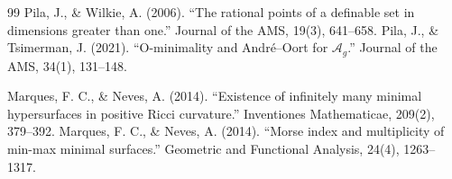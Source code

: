 \begin{thebibliography}{99}
 Pila, J., \& Wilkie, A. (2006). ``The rational points of a definable set in dimensions greater than one.'' Journal of the AMS, 19(3), 641--658.
 Pila, J., \& Tsimerman, J. (2021). ``O-minimality and André--Oort for $\mathcal{A}_g$.'' Journal of the AMS, 34(1), 131--148.

 Marques, F. C., \& Neves, A. (2014). ``Existence of infinitely many minimal hypersurfaces in positive Ricci curvature.'' Inventiones Mathematicae, 209(2), 379--392.
 Marques, F. C., \& Neves, A. (2014). ``Morse index and multiplicity of min-max minimal surfaces.'' Geometric and Functional Analysis, 24(4), 1263--1317.

\end{thebibliography}
